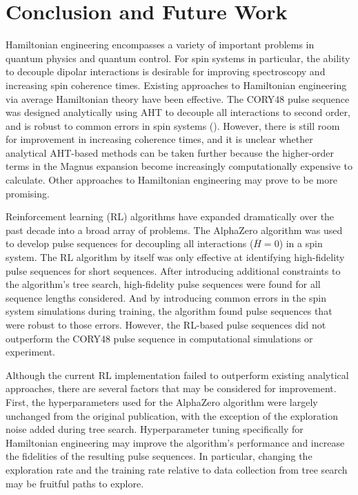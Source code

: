 \chapter{Conclusion and Future Work}

Hamiltonian engineering encompasses a variety of important problems in quantum physics and quantum control. For spin systems in particular, the ability to decouple dipolar interactions is desirable for improving spectroscopy and increasing spin coherence times.
Existing approaches to Hamiltonian engineering via average Hamiltonian theory have been effective. The CORY48 pulse sequence was designed analytically using AHT to decouple all interactions to second order, and is robust to common errors in spin systems (\cite{CORY1990205}). However, there is still room for improvement in increasing coherence times, and it is unclear whether analytical AHT-based methods can be taken further because the higher-order terms in the Magnus expansion become increasingly computationally expensive to calculate. Other approaches to Hamiltonian engineering may prove to be more promising.

Reinforcement learning (RL) algorithms have expanded dramatically over the past decade into a broad array of problems. The AlphaZero algorithm was used to develop pulse sequences for decoupling all interactions ($\overline{H} = 0$) in a spin system. The RL algorithm by itself was only effective at identifying high-fidelity pulse sequences for short sequences. After introducing additional constraints to the algorithm's tree search, high-fidelity pulse sequences were found for all sequence lengths considered. And by introducing common errors in the spin system simulations during training, the algorithm found pulse sequences that were robust to those errors. However, the RL-based pulse sequences did not outperform the CORY48 pulse sequence in computational simulations or experiment.


Although the current RL implementation failed to outperform existing analytical approaches, there are several factors that may be considered for improvement.
First, the hyperparameters used for the AlphaZero algorithm were largely unchanged from the original publication, with the exception of the exploration noise added during tree search. Hyperparameter tuning specifically for Hamiltonian engineering may improve the algorithm's performance and increase the fidelities of the resulting pulse sequences. In particular, changing the exploration rate and the training rate relative to data collection from tree search may be fruitful paths to explore.

